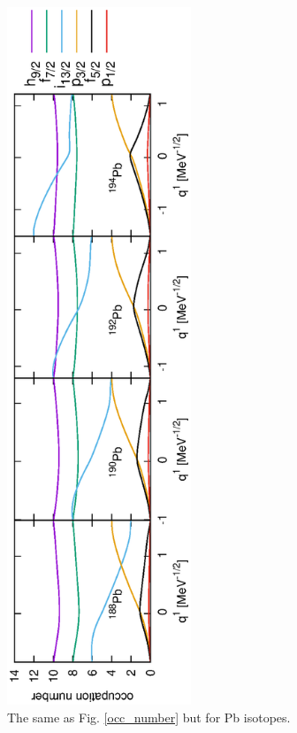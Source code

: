 \documentclass[11pt]{book} %
\begin{document}
\begin{figure}[tb]
 \begin{center}
  \includegraphics[width=55mm,angle=-90]{images/Pbocc_number.eps}
 \end{center}
	\caption{The same as Fig. \ref{occ_number} but for Pb isotopes.
}
 \label{Pb_occ_number}
\end{figure}
\end{document}
